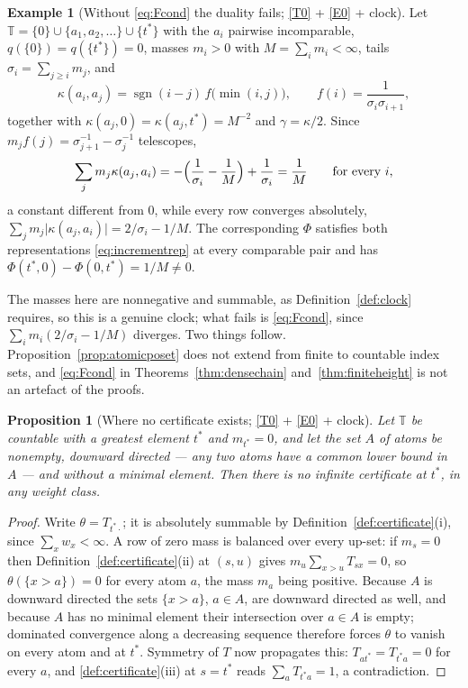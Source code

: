 \documentclass[11pt,a4paper]{article}
\theoremstyle{plain}
\newtheorem{proposition}[theorem]{Proposition}
\theoremstyle{definition}
\newtheorem{example}[theorem]{Example}
\theoremstyle{remark}
\newcommand{\T}{\mathbb{T}}                     %
\begin{document}
\begin{example}[Without \eqref{eq:Fcond} the duality fails; \eqref{T0} + \eqref{E0} + clock]
  \label{ex:antichain}
  Let $\T = \{0\} \cup \{a_1, a_2, \dots\} \cup \{t^*\}$ with the $a_i$ pairwise
  incomparable, $q(\{0\}) = q(\{t^*\}) = 0$, masses $m_i > 0$ with
  $M = \sum_i m_i < \infty$, tails $\sigma_i = \sum_{j \geq i} m_j$, and
  \[
    \kappa(a_i,a_j) = \operatorname{sgn}(i-j)\, f\bigl(\min(i,j)\bigr),
    \qquad f(i) = \frac{1}{\sigma_i \sigma_{i+1}} ,
  \]
  together with $\kappa(a_j,0) = \kappa(a_j,t^*) = M^{-2}$ and
  $\gamma = \kappa/2$.  Since $m_j f(j) = \sigma_{j+1}^{-1} - \sigma_j^{-1}$
  telescopes,
  \[
    \sum_j m_j \kappa(a_j,a_i)
      = -\Bigl(\frac{1}{\sigma_i} - \frac1M\Bigr) + \frac{1}{\sigma_i}
      = \frac1M
    \qquad\text{for every } i,
  \]
  a constant different from $0$, while every row converges absolutely,
  $\sum_j m_j \lvert\kappa(a_j,a_i)\rvert = 2/\sigma_i - 1/M$.  The
  corresponding $\Phi$ satisfies both representations \eqref{eq:incrementrep} at
  every comparable pair and has $\Phi(t^*,0) - \Phi(0,t^*) = 1/M \neq 0$.

  The masses here are nonnegative and summable, as
  Definition~\ref{def:clock} requires, so this is a genuine clock; what fails is
  \eqref{eq:Fcond}, since $\sum_i m_i (2/\sigma_i - 1/M)$ diverges.  Two things
  follow.  Proposition~\ref{prop:atomicposet} does not extend from finite to
  countable index sets, and \eqref{eq:Fcond} in
  Theorems~\ref{thm:densechain} and~\ref{thm:finiteheight} is not an artefact of
  the proofs.
\end{example}

\begin{proposition}[Where no certificate exists; \eqref{T0} + \eqref{E0} + clock]
  \label{prop:nocertificate}
  Let $\T$ be countable with a greatest element $t^*$ and $m_{t^*} = 0$, and let
  the set $A$ of atoms be nonempty, \emph{downward directed} --- any two atoms
  have a common lower bound in $A$ --- and \emph{without a minimal element}.
  Then there is no infinite certificate at $t^*$, in any weight class.
\end{proposition}

\begin{proof}
  Write $\theta = T_{t^*\cdot}$; it is absolutely summable by
  Definition~\ref{def:certificate}(i), since $\sum_x w_x < \infty$.  A row of
  zero mass is balanced over every up-set: if $m_s = 0$ then
  Definition~\ref{def:certificate}(ii) at $(s,u)$ gives
  $m_u \sum_{x > u} T_{sx} = 0$, so $\theta(\{x > a\}) = 0$ for every atom
  $a$, the mass $m_a$ being positive.  Because $A$ is downward directed the
  sets $\{x > a\}$, $a \in A$, are downward directed as well, and because $A$
  has no minimal element their intersection over $a \in A$ is empty; dominated
  convergence along a decreasing sequence therefore forces $\theta$ to vanish
  on every atom and at $t^*$.  Symmetry of $T$ now propagates this: $T_{a t^*}
  = T_{t^* a} = 0$ for every $a$, and \ref{def:certificate}(iii) at $s = t^*$
  reads $\sum_a T_{t^* a} = 1$, a contradiction.
\end{proof}
\end{document}
